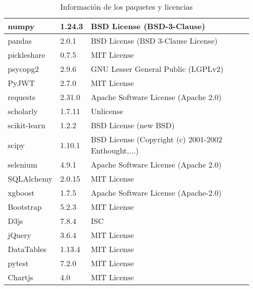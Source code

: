 \begin{table}[h]
\begin{tabular}{|l|l|l|}
numpy & 1.24.3 &  BSD License (BSD-3-Clause) \\ \hline
pandas & 2.0.1 &  BSD License (BSD 3-Clause License) \\ \hline
pickleshare & 0.7.5 &  MIT License \\ \hline
psycopg2 & 2.9.6 &  GNU Lesser General Public (LGPLv2) \\ \hline
PyJWT & 2.7.0 &  MIT License \\ \hline
requests & 2.31.0 &  Apache Software License (Apache 2.0) \\ \hline
scholarly & 1.7.11 &  Unlicense \\ \hline
scikit-learn & 1.2.2 & BSD License (new BSD) \\ \hline
scipy & 1.10.1 &  BSD License (Copyright (c) 2001-2002 Enthought,...) \\ \hline
selenium & 4.9.1 &  Apache Software License (Apache 2.0) \\ \hline
SQLAlchemy & 2.0.15 &  MIT License \\ \hline
xgboost & 1.7.5 &  Apache Software License (Apache-2.0) \\ \hline
Bootstrap & 5.2.3 &  MIT License \\ \hline
D3js & 7.8.4 &  ISC \\ \hline
jQuery & 3.6.4 &  MIT License \\ \hline
DataTables & 1.13.4 &  MIT License \\ \hline
pytest & 7.2.0 &  MIT License \\ \hline
Chartjs & 4.0 & MIT License \\ \hline
\end{tabular}
\caption{Información de los paquetes y licencias}
\label{tab:paquetes-licencias}
\end{table}


